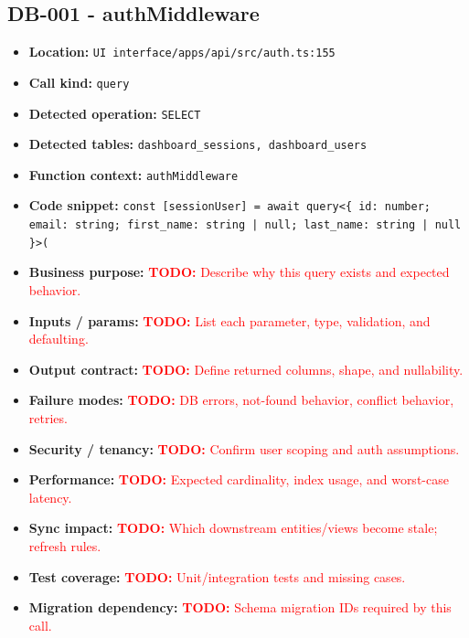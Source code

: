 \documentclass[11pt]{article}
\newcommand{\todoitem}[1]{\textcolor{red}{\textbf{TODO:} #1}}
\begin{document}
\subsection{DB-001 - authMiddleware}
\begin{itemize}[leftmargin=1.5em]
\item \textbf{Location:} \texttt{UI interface/apps/api/src/auth.ts:155}
\item \textbf{Call kind:} \texttt{query}
\item \textbf{Detected operation:} \texttt{SELECT}
\item \textbf{Detected tables:} \texttt{dashboard\_sessions, dashboard\_users}
\item \textbf{Function context:} \texttt{authMiddleware}
\item \textbf{Code snippet:} \texttt{const [sessionUser] = await query<\{ id: number; email: string; first\_name: string | null; last\_name: string | null \}>(}
\item \textbf{Business purpose:} \todoitem{Describe why this query exists and expected behavior.}
\item \textbf{Inputs / params:} \todoitem{List each parameter, type, validation, and defaulting.}
\item \textbf{Output contract:} \todoitem{Define returned columns, shape, and nullability.}
\item \textbf{Failure modes:} \todoitem{DB errors, not-found behavior, conflict behavior, retries.}
\item \textbf{Security / tenancy:} \todoitem{Confirm user scoping and auth assumptions.}
\item \textbf{Performance:} \todoitem{Expected cardinality, index usage, and worst-case latency.}
\item \textbf{Sync impact:} \todoitem{Which downstream entities/views become stale; refresh rules.}
\item \textbf{Test coverage:} \todoitem{Unit/integration tests and missing cases.}
\item \textbf{Migration dependency:} \todoitem{Schema migration IDs required by this call.}
\end{itemize}
\end{document}
